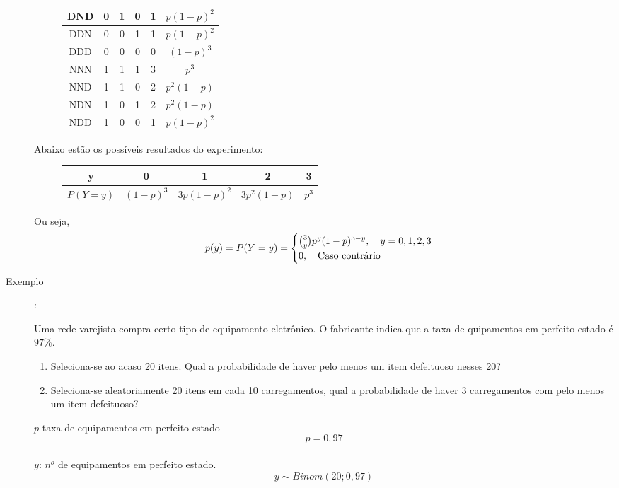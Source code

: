 \begin{description}
\begin{figure}[H]
\begin{tabular}{c c c c c c }
       DND& 0 & 1 & 0 & 1 & $p(1-p)^2$\\\midrule

       DDN& 0 & 0 & 1 & 1 & $p(1-p)^2$\\\midrule

       DDD&  0 & 0 & 0 & 0 & $(1-p)^3$\\\midrule

       NNN&   1 & 1 & 1 & 3 & $p^3$\\\midrule

       NND& 1 & 1 & 0 & 2 & $p^2(1-p)$\\\midrule

       NDN& 1 & 0 & 1 & 2 & $p^2(1-p)$\\\midrule

       NDD& 1 & 0 & 0 & 1 & $p(1-p)^2$ \\ \bottomrule

     \end{tabular}
   \end{figure}

     Abaixo estão os possíveis resultados do experimento:


     \begin{figure}[H]
       \centering
       \begin{tabular}{c c c c c}
         \toprule
         y&0&1&2&3\\ \midrule
         $P(Y=y)$&$(1-p)^3$&$3p(1-p)^2$&$3p^2(1-p)$&$p^3$\\ \bottomrule
       \end{tabular}
       \label{fig:127}
     \end{figure}
      Ou seja,
      \begin{align*}
        p(y)=P(Y=y)=\begin{cases}
          \binom{3}{y}p^y (1-p)^{3-y}, \text{\quad}y=0,1,2,3\\
          0, \text{\quad Caso contrário}
        \end{cases}
      \end{align*}
    \item[Exemplo]:
      
      Uma rede varejista compra certo tipo de equipamento eletrônico. O 
      fabricante indica que a taxa de quipamentos em perfeito estado é $97\%$.
      \begin{enumerate}[label=(\alph*)]
        \item Seleciona-se ao acaso 20 itens. Qual a probabilidade de haver pelo menos 
          um item defeituoso nesses 20?
        \item Seleciona-se aleatoriamente 20 itens em cada 10 carregamentos, qual a 
          probabilidade de haver 3 carregamentos com pelo menos um item defeituoso?
      \end{enumerate}
      $p$ taxa de equipamentos em perfeito estado\\
      $$p=0,97$$\\
      $y$: $n^o$ de equipamentos em perfeito estado.\\
      $$y \sim Binom(20;0,97)$$\\


\end{description}
